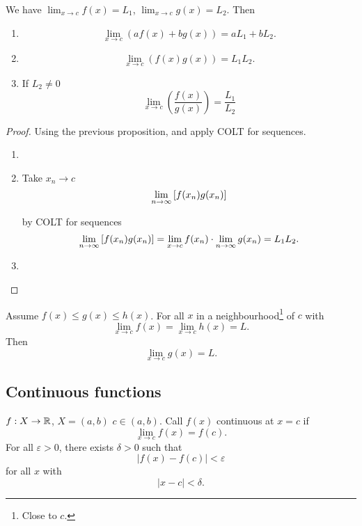 \documentclass[10pt, a4paper]{article}
\begin{document}
\begin{proposition}[COLT]
    We have $\lim_{x \to c}f(x) = L_1$,
    $\lim_{x \to c}g(x) = L_2$.
    Then
    \begin{enumerate}[label = (\roman*)]
        \item
        \[
        \lim_{x \to c}(af(x) + bg(x)) = aL_1 + bL_2.
        \]

        \item
        \[
        \lim_{x \to c}(f(x)g(x)) = L_1L_2.
        \]

        \item If $L_2 \neq 0$
        \[
        \lim_{x \to c}\left(\frac{f(x)}{g(x)}\right) = \frac{L_1}{L_2}
        \]
    \end{enumerate}

    \begin{proof}
        Using the previous proposition,
        and apply COLT for sequences.
        \begin{enumerate}[label = (\roman*)]
            \item \phantom{}
            
            \item Take $x_n \to c$
            \[
            \lim_{n \rightarrow \infty}\left[f(x_n)g(x_n)\right]
            \]
            
            by COLT for sequences
            \[
            \lim_{n \rightarrow \infty}\left[f(x_n)g(x_n)\right] = \lim_{x \to c}f(x_n)\cdot\lim_{n \rightarrow \infty} g(x_n) = L_1L_2.
            \]
            
            \item \phantom{}
        \end{enumerate}
    \end{proof}
\end{proposition}

\begin{proposition}[Squeezing]
    Assume $f(x) \leq g(x) \leq h(x)$.
    For all $x$ in a neighbourhood\footnote{Close to $c$.} of $c$ with
    \[
    \lim_{x \to c}f(x) = \lim_{x \to c}h(x) = L.
    \]
    Then
    \[
    \lim_{x \to c}g(x) = L.
    \]
\end{proposition}

\subsection{Continuous functions}

\begin{definition}[Co]
    $f : X \to \mathbb{R}$,
    $X = (a, b)$
    $c \in (a, b)$.
    Call $f(x)$ continuous at $x = c$ if
    \[
    \lim_{x \to c}f(x) = f(c).
    \]
    For all $\varepsilon > 0$,
    there exists $\delta > 0$ such that
    \[
    |f(x) - f(c)| < \varepsilon
    \]
    for all $x$ with
    \[
    |x - c| < \delta.
    \]
\end{definition}
\end{document}
